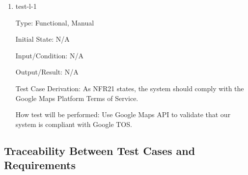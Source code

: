 \documentclass[12pt, titlepage]{article}
\begin{document}
\begin{enumerate}

\item{test-l-1\\}

Type: Functional, Manual

Initial State: N/A	

Input/Condition: N/A		

Output/Result: N/A

Test Case Derivation: As NFR21 states, the system should comply with the Google Maps Platform Terms of Service.

How test will be performed: Use Google Maps API to validate that our system is compliant with Google TOS. 

\end{enumerate}


\newpage

\subsection{Traceability Between Test Cases and Requirements}
  
\end{document}
